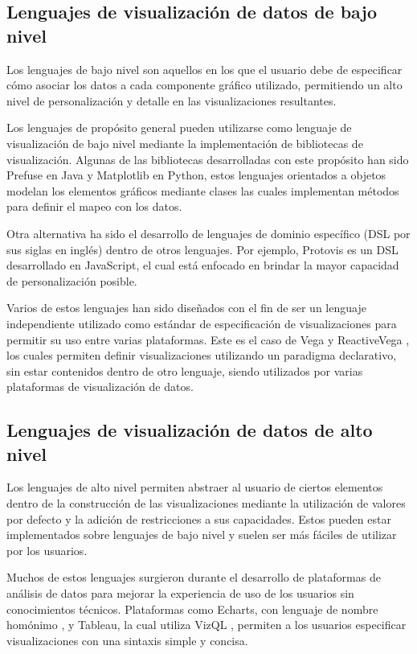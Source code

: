 \subsection{Lenguajes de visualizaci\'on de datos de bajo nivel}
Los lenguajes de bajo nivel son aquellos en los que el usuario debe de especificar c\'omo asociar los
datos a cada componente gr\'afico utilizado, permitiendo un alto nivel de personalizaci\'on y detalle en
las visualizaciones resultantes.

Los lenguajes de prop\'osito general pueden utilizarse como lenguaje de visualizaci\'on de bajo nivel
mediante la implementaci\'on de bibliotecas de visualizaci\'on. Algunas de las bibliotecas desarrolladas
con este prop\'osito han sido Prefuse \cite{heer2005prefuse} en Java y Matplotlib \cite{matplotlib} en Python,
estos lenguajes orientados a objetos modelan
los elementos gr\'aficos mediante clases las cuales implementan m\'etodos para definir el mapeo con los datos.

Otra alternativa ha sido el desarrollo de lenguajes
de dominio espec\'ifico (DSL por sus siglas en ingl\'es) dentro de otros lenguajes. Por ejemplo,
Protovis \cite{bostock2009protovis} es un DSL desarrollado en JavaScript,
el cual est\'a enfocado en brindar la mayor capacidad de personalizaci\'on posible.

Varios de estos lenguajes han sido dise\~nados con el fin de ser un lenguaje independiente utilizado como est\'andar
de especificaci\'on de visualizaciones para permitir su uso entre varias plataformas. Este es el caso de
Vega \cite{vegaLang} y ReactiveVega \cite{satyanarayan2015reactive}, los cuales permiten definir visualizaciones utilizando
un paradigma declarativo, sin estar contenidos dentro de otro lenguaje, siendo utilizados por varias plataformas de
visualizaci\'on de datos.

\subsection{Lenguajes de visualizaci\'on de datos de alto nivel}
Los lenguajes de alto nivel permiten abstraer al usuario de ciertos elementos dentro de la construcci\'on
de las visualizaciones mediante la utilizaci\'on de valores por defecto y la adici\'on de restricciones a sus capacidades. Estos pueden
estar implementados sobre lenguajes de bajo nivel y suelen ser m\'as f\'aciles de utilizar por los usuarios.

Muchos de estos lenguajes surgieron durante el desarrollo de plataformas
de an\'alisis de datos para mejorar la experiencia de uso de los usuarios sin conocimientos t\'ecnicos.
Plataformas como Echarts, con lenguaje de nombre hom\'onimo \cite{li2018echarts}, y Tableau, la cual utiliza VizQL \cite{hanrahan2006vizql},
permiten a los usuarios especificar visualizaciones con una sintaxis simple y concisa.


